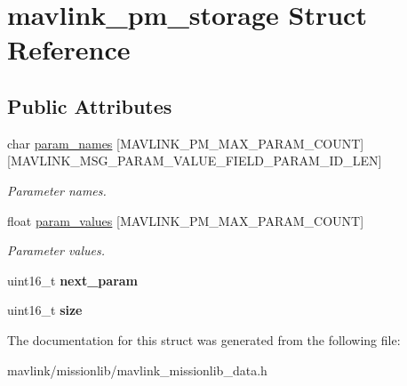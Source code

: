 \hypertarget{structmavlink__pm__storage}{}\section{mavlink\+\_\+pm\+\_\+storage Struct Reference}
\label{structmavlink__pm__storage}
\subsection*{Public Attributes}
\begin{DoxyCompactItemize}
\item 
\mbox{\label{structmavlink__pm__storage_a719fa8f1550466f917769092c5343b2b}} 
char \hyperlink{structmavlink__pm__storage_a719fa8f1550466f917769092c5343b2b}{param\+\_\+names} \mbox{[}M\+A\+V\+L\+I\+N\+K\+\_\+\+P\+M\+\_\+\+M\+A\+X\+\_\+\+P\+A\+R\+A\+M\+\_\+\+C\+O\+U\+NT\mbox{]}\mbox{[}M\+A\+V\+L\+I\+N\+K\+\_\+\+M\+S\+G\+\_\+\+P\+A\+R\+A\+M\+\_\+\+V\+A\+L\+U\+E\+\_\+\+F\+I\+E\+L\+D\+\_\+\+P\+A\+R\+A\+M\+\_\+\+I\+D\+\_\+\+L\+EN\mbox{]}
\begin{DoxyCompactList}\small\item\em Parameter names. \end{DoxyCompactList}\item 
\mbox{\label{structmavlink__pm__storage_a5586047ee3b902cb0c470e10459361a6}} 
float \hyperlink{structmavlink__pm__storage_a5586047ee3b902cb0c470e10459361a6}{param\+\_\+values} \mbox{[}M\+A\+V\+L\+I\+N\+K\+\_\+\+P\+M\+\_\+\+M\+A\+X\+\_\+\+P\+A\+R\+A\+M\+\_\+\+C\+O\+U\+NT\mbox{]}
\begin{DoxyCompactList}\small\item\em Parameter values. \end{DoxyCompactList}\item 
\mbox{\label{structmavlink__pm__storage_a5610bf00b258287b0bf32aa6aeb459e0}} 
uint16\+\_\+t {\bfseries next\+\_\+param}
\item 
\mbox{\label{structmavlink__pm__storage_a9f960195bdc7c92ca92d389ad0831a95}} 
uint16\+\_\+t {\bfseries size}
\end{DoxyCompactItemize}


The documentation for this struct was generated from the following file\+:\begin{DoxyCompactItemize}
\item 
mavlink/missionlib/mavlink\+\_\+missionlib\+\_\+data.\+h\end{DoxyCompactItemize}

